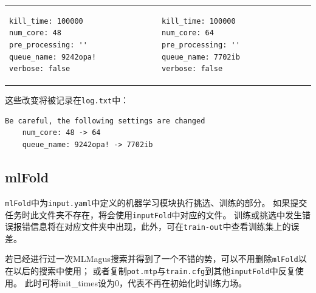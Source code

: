 \documentclass[12pt]{article}
\newcommand{\file}[1]{\texttt{#1}}
\begin{document}
\begin{center}
    \begin{tabular}{p{200pt}<{\centering} p{200pt}<{\centering}}
        \begin{tcolorbox}[title=old\_job\_controller]
            \begin{verbatim} 
kill_time: 100000                                                             
num_core: 48
pre_processing: ''
queue_name: 9242opa!
verbose: false
            \end{verbatim}
        \end{tcolorbox}                   
        & 
        \begin{tcolorbox}[title=new\_job\_controller]
            \begin{verbatim} 
kill_time: 100000                                                              
num_core: 64
pre_processing: ''
queue_name: 7702ib
verbose: false
            \end{verbatim}
        \end{tcolorbox}
    \end{tabular}
\end{center}
\par
这些改变将被记录在\file{log.txt}中：
\begin{tcolorbox}[title=log.txt]
    \begin{verbatim} 
Be careful, the following settings are changed                                                
    num_core: 48 -> 64
    queue_name: 9242opa! -> 7702ib
    \end{verbatim}
\end{tcolorbox}                   

\subsection{mlFold}
\file{mlFold}中为\file{input.yaml}中定义的机器学习模块执行挑选、训练的部分。
如果提交任务时此文件夹不存在，将会使用\file{inputFold}中对应的文件。
训练或挑选中发生错误报错信息将在对应文件夹中出现，此外，可在\file{train-out}中查看训练集上的误差。
\par
若已经进行过一次MLMagus搜索并得到了一个不错的势，可以不用删除\file{mlFold}以在以后的搜索中使用；
或者复制\file{pot.mtp}与\file{train.cfg}到其他\file{inputFold}中反复使用。
此时可将init\_times设为0，代表不再在初始化时训练力场。
\end{document}
